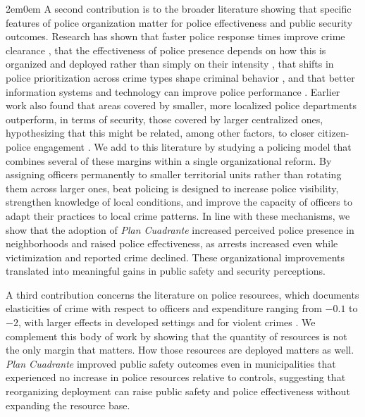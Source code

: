 \begin{adjustwidth}{2em}{0em}
A second contribution is to the broader literature showing that specific features of police organization matter for police effectiveness and public security outcomes. Research has shown that faster police response times improve crime clearance \citep{Blanes_Kirchmaier}, that the effectiveness of police presence depends on how this is organized and deployed rather than simply on their intensity \citep{facchetti2025, MASTROBUONI2019, Blanes_Mastrobuoni_2018}, that shifts in police prioritization across crime types shape criminal behavior \citep{Adda_etal_2014}, and that better information systems and technology can improve police performance \citep{Mastrobuoni_2020}. Earlier work also found that areas covered by smaller, more localized police departments outperform, in terms of security, those covered by larger centralized ones, hypothesizing that this might be related, among other factors, to closer citizen-police engagement \citep{ostrom1973, ostrom1978}. We add to this literature by studying a policing model that combines several of these margins within a single organizational reform. By assigning officers permanently to smaller territorial units rather than rotating them across larger ones, beat policing is designed to increase police visibility, strengthen knowledge of local conditions, and improve the capacity of officers to adapt their practices to local crime patterns. In line with these mechanisms, we show that the adoption of \emph{Plan Cuadrante} increased perceived police presence in neighborhoods and raised police effectiveness, as arrests increased even while victimization and reported crime declined. These organizational improvements translated into meaningful gains in public safety and security perceptions.

A third contribution concerns the literature on police resources, which documents elasticities of crime with respect to officers and expenditure ranging from $-0.1$ to $-2$, with larger effects in developed settings and for violent crimes \citep{Chalfin_JEL, Levitt_1997, DiTella}. We complement this body of work by showing that the quantity of resources is not the only margin that matters. How those resources are deployed matters as well. \emph{Plan Cuadrante} improved public safety outcomes even in municipalities that experienced no increase in police resources relative to controls, suggesting that reorganizing deployment can raise public safety and police effectiveness without expanding the resource base.


\end{adjustwidth}
